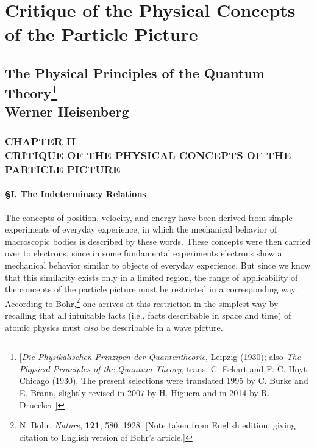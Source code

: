 \chapter{Critique of the Physical Concepts of the Particle Picture}\label{ch:heisenberg}


\renewcommand{\theequation}{\arabic{equation}}



\section*{The Physical Principles of the Quantum Theory\footnote{{[}\emph{Die
  Physikalischen Prinzipen der Quantentheorie}, Leipzig (1930); also
  \emph{The Physical Principles of the Quantum Theory}, trans. C. Eckart
  and F. C. Hoyt, Chicago (1930). The present selections were translated
  1995 by C. Burke and E. Brann, slightly revised in 2007 by H. Higuera
  and in 2014 by R. Druecker.{]}}\\
  {\large Werner Heisenberg}}

\subsection*{CHAPTER II\\
CRITIQUE OF THE PHYSICAL CONCEPTS OF THE PARTICLE PICTURE}

\subsubsection*{§I. The Indeterminacy Relations}

The concepts of position, velocity, and energy have been derived from
simple experiments of everyday experience, in which the mechanical
behavior of macroscopic bodies is described by these words. These
concepts were then carried over to electrons, since in some fundamental
experiments electrons show a mechanical behavior similar to objects of
everyday experience. But since we know that this similarity exists only
in a limited region, the range of applicability of the concepts of the
particle picture must be restricted in a corresponding way. According to
Bohr,\footnote{N. Bohr, \emph{Nature}, \textbf{121}, 580, 1928. {[}Note taken
  from English edition, giving citation to English version of Bohr's
  article.{]}} one arrives at this restriction in the simplest way by
recalling that all intuitable facts (i.e., facts describable in space
and time) of atomic physics must \emph{also} be describable in a wave
picture.

